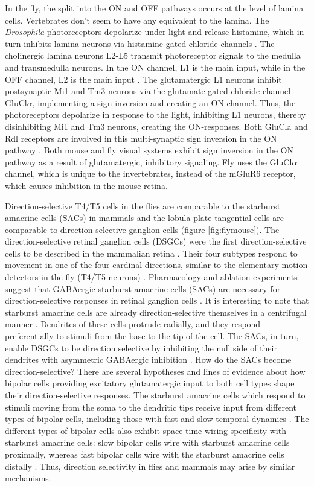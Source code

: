 In the fly, the split into the ON and OFF pathways occurs at the level of lamina cells. Vertebrates don't seem to have any equivalent to the lamina. The \textit{Drosophila} photoreceptors depolarize under light and release histamine, which in turn inhibits lamina neurons via histamine-gated chloride channels \parencite{Hardie1989}. The cholinergic lamina neurons L2-L5 transmit photoreceptor signals to the medulla and transmedulla neurons. In the ON channel, L1 is the main input, while in the OFF channel, L2 is the main input \parencite{Joesch2010}. The glutamatergic L1 neurons inhibit postsynaptic Mi1 and Tm3 neurons via the glutamate-gated chloride channel GluCl$\alpha$, implementing a sign inversion and creating an ON channel. Thus, the photoreceptors depolarize in response to the light, inhibiting L1 neurons, thereby disinhibiting Mi1 and Tm3 neurons, creating the ON-responses. Both GluCla and Rdl receptors are involved in this multi-synaptic sign inversion in the ON pathway \parencite{Molina2019}. Both mouse and fly visual systems exhibit sign inversion in the ON pathway as a result of glutamatergic, inhibitory signaling. Fly uses the GluCl$\alpha$ channel, which is unique to the invertebrates, instead of the mGluR6 receptor, which causes inhibition in the mouse retina.

Direction-selective T4/T5 cells in the flies are comparable to the starburst amacrine cells (SACs) in mammals and the lobula plate tangential cells are comparable to direction-selective ganglion cells (figure \ref{fig:flymouse}). The direction-selective retinal ganglion cells (DSGCs) were the first direction-selective cells to be described in the mammalian retina \parencite{Barlow1963}. Their four subtypes respond to movement in one of the four cardinal directions, similar to the elementary motion detectors in the fly (T4/T5 neurons) \parencite{Elstrott2008}. Pharmacology and ablation experiments suggest that GABAergic starburst amacrine cells (SACs) are necessary for direction-selective responses in retinal ganglion cells \parencite{Yoshida2001}. It is interesting to note that starburst amacrine cells are already direction-selective themselves in a centrifugal manner \parencite{Euler2002}. Dendrites of these cells protrude radially, and they respond preferentially to stimuli from the base to the tip of the cell. The SACs, in turn, enable DSGCs to be direction selective by inhibiting the null side of their dendrites with asymmetric GABAergic inhibition \parencite{Briggman2011}. How do the SACs become direction-selective? There are several hypotheses and lines of evidence about how bipolar cells providing excitatory glutamatergic input to both cell types shape their direction-selective responses. The starburst amacrine cells which respond to stimuli moving from the soma to the dendritic tips receive input from different types of bipolar cells, including those with fast and slow temporal dynamics \parencite{Baden2013}. The different types of bipolar cells also exhibit space-time wiring specificity with starburst amacrine cells: slow bipolar cells wire with starburst amacrine cells proximally, whereas fast bipolar cells wire with the starburst amacrine cells distally \parencite{Kim2014}. Thus, direction selectivity in flies and mammals may arise by similar mechanisms.

